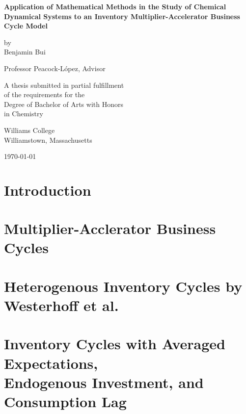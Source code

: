 \documentclass[12pt,twoside]{report}
\begin{document}
\begin{titlepage}
	\begin{center}
		\vspace*{1.5 cm}
		\textbf{Application of Mathematical Methods in the Study of Chemical Dynamical Systems to an Inventory Multiplier-Accelerator Business Cycle Model}


		\vspace{1.5 cm}

		by\\ Benjamin Bui
		\vspace{1.5 cm}

		Professor Peacock-L\'opez, Advisor
		\vspace{1.5 cm}

		A thesis submitted in partial fulfillment\\
		of the requirements for the\\
		Degree of Bachelor of Arts with Honors\\
		in Chemistry
		\vspace{1.5 cm}

		Williams College\\
		Williamstown, Massachusetts
		\vspace{1.5 cm}

		\today
	\end{center}
\end{titlepage}




\tableofcontents
\chapter{Introduction}

\chapter{Multiplier-Acclerator Business Cycles}\label{ch:multiplier-accelerator}

\chapter{Heterogenous Inventory Cycles by Westerhoff et al.}

\chapter{Inventory Cycles with Averaged Expectations,\\ Endogenous Investment, and Consumption Lag}

\end{document}
